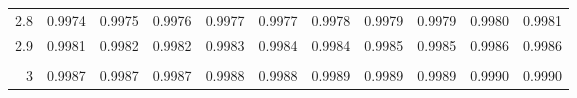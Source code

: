 \begin{center}
\begin{tabular}{r|rrrrrrrrrr}
       2.8 &     0.9974 &     0.9975 &     0.9976 &     0.9977 &     0.9977 &     0.9978 &     0.9979 &     0.9979 &     0.9980 &     0.9981 \\

       2.9 &     0.9981 &     0.9982 &     0.9982 &     0.9983 &     0.9984 &     0.9984 &     0.9985 &     0.9985 &     0.9986 &     0.9986 \\

           &            &            &            &            &            &            &            &            &            &            \\

         3 &     0.9987 &     0.9987 &     0.9987 &     0.9988 &     0.9988 &     0.9989 &     0.9989 &     0.9989 &     0.9990 &     0.9990
\end{tabular} 
\end{center}
